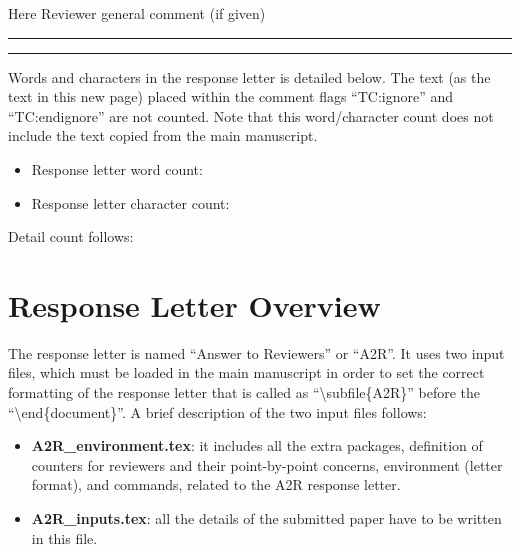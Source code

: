 \documentclass[./IEEE_Journal.tex]{subfiles}
\begin{document}
\reviewersection 
Here Reviewer general comment (if given) 



\vspace{2cm} \hrule \vspace{0.2cm} \hrule \vspace{0.5cm}

\color{magenta}

Words and characters in the response letter is detailed below. 
The text (as the text in this new page) placed within the comment flags ``TC:ignore'' and ``TC:endignore'' are not counted.
Note that this word/character count does not include the text copied from the main manuscript.

\begin{itemize}
    \item Response letter word count: 
    \item Response letter character count: 
\end{itemize}

\par{Detail count follows:}

\color{black}







\twocolumn


\section{Response Letter Overview}\label{sec:overview}
The response letter is named ``Answer to Reviewers'' or ``A2R''.
It uses two input files, which must be loaded in the main manuscript in order to set the correct formatting of the response letter that is called as ``\textbackslash subfile\{A2R\}'' before the ``\textbackslash end\{document\}''.
A brief description of the two input files follows:
\begin{itemize}
    \item \textbf{A2R\_environment.tex}: it includes all the extra packages, definition of counters for reviewers and their point-by-point concerns, environment (letter format), and commands, related to the A2R response letter.
    \item \textbf{A2R\_inputs.tex}: all the details of the submitted paper have to be written in this file. 
\end{itemize}
\end{document}
